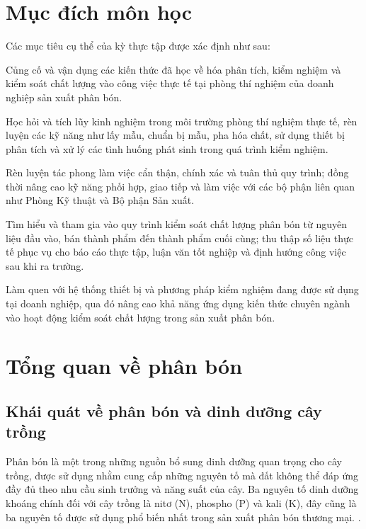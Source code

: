\section{Mục đích môn học}
Các mục tiêu cụ thể của kỳ thực tập được xác định như sau:

Củng cố và vận dụng các kiến thức đã học về hóa phân tích, kiểm nghiệm và kiểm soát chất lượng vào công việc thực tế tại phòng thí nghiệm của doanh nghiệp sản xuất phân bón.

Học hỏi và tích lũy kinh nghiệm trong môi trường phòng thí nghiệm thực tế, rèn luyện các kỹ năng như lấy mẫu, chuẩn bị mẫu, pha hóa chất, sử dụng thiết bị phân tích và xử lý các tình huống phát sinh trong quá trình kiểm nghiệm.

Rèn luyện tác phong làm việc cẩn thận, chính xác và tuân thủ quy trình; đồng thời nâng cao kỹ năng phối hợp, giao tiếp và làm việc với các bộ phận liên quan như Phòng Kỹ thuật và Bộ phận Sản xuất.

Tìm hiểu và tham gia vào quy trình kiểm soát chất lượng phân bón từ nguyên liệu đầu vào, bán thành phẩm đến thành phẩm cuối cùng; thu thập số liệu thực tế phục vụ cho báo cáo thực tập, luận văn tốt nghiệp và định hướng công việc sau khi ra trường.

Làm quen với hệ thống thiết bị và phương pháp kiểm nghiệm đang được sử dụng tại doanh nghiệp, qua đó nâng cao khả năng ứng dụng kiến thức chuyên ngành vào hoạt động kiểm soát chất lượng trong sản xuất phân bón.

\section{Tổng quan về phân bón}
\subsection{Khái quát về phân bón và dinh dưỡng cây trồng}
Phân bón là một trong những nguồn bổ sung dinh dưỡng quan trọng cho cây trồng, được sử dụng nhằm cung cấp những nguyên tố mà đất không thể đáp ứng đầy đủ theo nhu cầu sinh trưởng và năng suất của cây. 
Ba nguyên tố dinh dưỡng khoáng chính đối với cây trồng là nitơ (N), phospho (P) và kali (K), đây cũng là ba nguyên tố được sử dụng phổ biến nhất trong sản xuất phân bón thương mại. \cite{fao-plant-nutrition,fao-fertilizer-specifications}.

